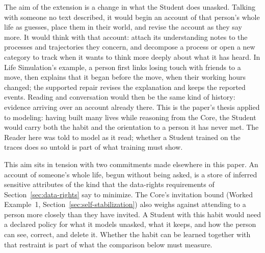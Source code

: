 \documentclass[11pt]{article}
\begin{document}
The aim of the extension is a change in what the Student does unasked. Talking
with someone no text described, it would begin an account of that person's whole
life as guesses, place them in their world, and revise the account as they say
more. It would think with that account: attach its understanding notes to the
processes and trajectories they concern, and decompose a process or open a new
category to track when it wants to think more deeply about what it has heard. In
Life Simulation's example, a person first links losing touch with friends to a
move, then explains that it began before the move, when their working hours
changed; the supported repair revises the explanation and keeps the reported
events. Reading and conversation would then be the same kind of history: evidence
arriving over an account already there. This is the paper's thesis applied to
modeling: having built many lives while reasoning from the Core, the Student
would carry both the habit and the orientation to a person it has never met. The
Reader here was told to model as it read; whether a Student trained on the traces
does so untold is part of what training must show.

This aim sits in tension with two commitments made elsewhere in this paper. An
account of someone's whole life, begun without being asked, is a store of
inferred sensitive attributes of the kind that the data-rights requirements of
Section~\ref{sec:data-rights} say to minimize. The Core's invitation bound
(Worked Example~1, Section~\ref{sec:self-stabilization}) also weighs against
attending to a person more closely than they have invited. A Student with this
habit would need a declared policy for what it models unasked, what it keeps,
and how the person can see, correct, and delete it. Whether the habit can be
learned together with that restraint is part of what the comparison below must
measure.
\end{document}
